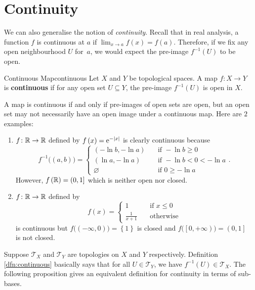 \documentclass[math]{amznotes}
\theoremstyle{remark}
\newcommand{\e}{\mathrm{e}}
\begin{document}
\section{Continuity}
We can also generalise the notion of \textit{continuity}. Recall that in real analysis, a function $f$ is continuous at $a$ if $\lim_{x \to a}f\left(x\right) = f\left(a\right)$. Therefore, if we fix any open neighbourhood $U$ for~$a$, we would expect the pre-image $f^{-1}\left(U\right)$ to be open.
\begin{dfnbox}{Continuous Map}{continuous}
    Let $X$ and $Y$ be topological spaces. A map $f \colon X \to Y$ is {\color{red} \textbf{continuous}} if for any open set $U \subseteq Y$, the pre-image $f^{-1}\left(U\right)$ is open in $X$.
\end{dfnbox}
A map is continuous if and only if pre-images of open sets are open, but an open set may not necessarily have an open image under a continuous map. Here are $2$ examples:
\begin{enumerate}
    \item $f \colon \mathbb{R} \to \mathbb{R}$ defined by $f\left(x\right) = \e^{-\abs{x}}$ is clearly continuous because
    \begin{equation*}
        f^{-1}\bigl(\left(a, b\right)\bigr) = \begin{cases}
            \left(-\ln b, -\ln a\right) & \quad\textrm{if } -\ln b \geq 0 \\
            \left(\ln a, -\ln a\right) & \quad\textrm{if } -\ln b < 0 < -\ln a \\
            \varnothing & \quad\textrm{if } 0 \geq -\ln a
        \end{cases}.
    \end{equation*}
    However, $f\left(\mathbb{R}\right) = \left(0, 1\right]$ which is neither open nor closed.
    \item $f \colon \mathbb{R} \to \mathbb{R}$ defined by 
    \begin{equation*}
        f\left(x\right) = \begin{cases}
            1 & \quad\textrm{if } x \leq 0 \\
            \frac{1}{x + 1} & \quad\textrm{otherwise}
        \end{cases}
    \end{equation*}
    is continuous but $f\bigl(\left(-\infty, 0\right)\bigr) = \left\{1\right\}$ is closed and $f\bigl(\left[0, +\infty\right)\bigr) = \left(0, 1\right]$ is not closed.
\end{enumerate}
Suppose $\mathcal{T}_X$ and $\mathcal{T}_Y$ are topologies on $X$ and $Y$ respectively. Definition \ref{dfn:continuous} basically says that for all $U \in \mathcal{T}_Y$, we have $f^{-1}\left(U\right) \in \mathcal{T}_X$. The following proposition gives an equivalent definition for continuity in terms of sub-bases.
\end{document}
